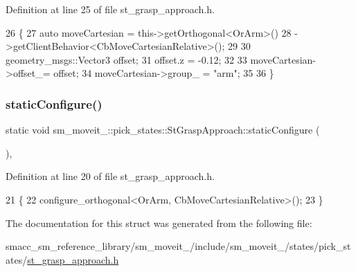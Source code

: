 Definition at line 25 of file st\+\_\+grasp\+\_\+approach.\+h.


\begin{DoxyCode}
26     \{
27         \textcolor{keyword}{auto} moveCartesian = this->getOrthogonal<OrArm>()
28                                 ->getClientBehavior<CbMoveCartesianRelative>();
29 
30         geometry\_msgs::Vector3 offset;
31         offset.z = -0.12;
32 
33         moveCartesian->offset\_= offset;
34         moveCartesian->group\_ = \textcolor{stringliteral}{"arm"};
35 
36     \}
\end{DoxyCode}
\mbox{\label{structsm__moveit__2_1_1pick__states_1_1StGraspApproach_a00eabca26f789c254d302e9323153e3c}} 
\subsubsection{\texorpdfstring{static\+Configure()}{staticConfigure()}}
{\footnotesize\ttfamily static void sm\+\_\+moveit\+\_\+::pick\+\_\+states\+::\+St\+Grasp\+Approach\+::static\+Configure (\begin{DoxyParamCaption}{ }\end{DoxyParamCaption})\hspace{0.3cm}{\ttfamily [inline]}, {\ttfamily [static]}}



Definition at line 20 of file st\+\_\+grasp\+\_\+approach.\+h.


\begin{DoxyCode}
21     \{ 
22         configure\_orthogonal<OrArm, CbMoveCartesianRelative>();
23     \}
\end{DoxyCode}


The documentation for this struct was generated from the following file\+:\begin{DoxyCompactItemize}
\item 
smacc\+\_\+sm\+\_\+reference\+\_\+library/sm\+\_\+moveit\+\_/include/sm\+\_\+moveit\+\_/states/pick\+\_\+states/\hyperlink{2_2include_2sm__moveit__2_2states_2pick__states_2st__grasp__approach_8h}{st\+\_\+grasp\+\_\+approach.\+h}\end{DoxyCompactItemize}
